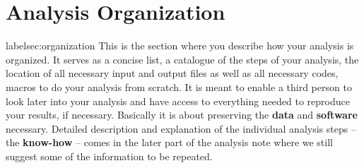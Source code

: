\documentclass[12pt]{article}
\begin{document}
\newpage

\label{sec:organization}

\section{Analysis Organization}
label{sec:organization}
This is the section where you
describe how your analysis is organized.  It serves as a concise
list, a catalogue of the steps of your analysis, the location of all necessary
input and output files as well as all necessary codes, macros to do
your analysis from scratch.
It is meant to enable a third person to look later into your
analysis and have access to everything needed to reproduce your
results, if necessary.  Basically it is about preserving the
{\bf data} and {\bf software} necessary.
Detailed description and explanation of the 
individual analysis steps -- the {\bf know-how} -- 
comes in the later part of the analysis note where
we still suggest some of the information to be repeated.
\end{document}
